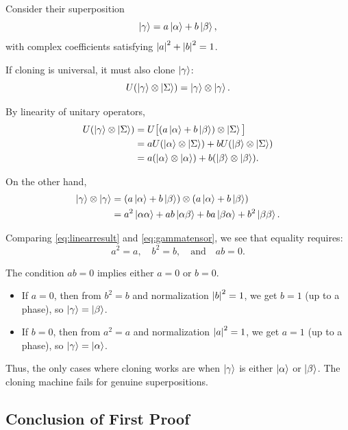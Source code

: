 \documentclass[12pt]{article}
\newcommand{\tensor}{\otimes}
\begin{document}
Consider their superposition
\[
\ket{\gamma} = a\ket{\alpha} + b\ket{\beta},
\]
with complex coefficients satisfying $\abs{a}^2 + \abs{b}^2 = 1$.

If cloning is universal, it must also clone $\ket{\gamma}$:
\begin{equation}
U(\ket{\gamma} \tensor \ket{\Sigma}) = \ket{\gamma} \tensor \ket{\gamma}.
\label{eq:clonepsi}
\end{equation}

By linearity of unitary operators,
\begin{align}
U(\ket{\gamma} \tensor \ket{\Sigma})
&= U\big[(a\ket{\alpha} + b\ket{\beta}) \tensor \ket{\Sigma}\big] \\
&= aU(\ket{\alpha} \tensor \ket{\Sigma}) + bU(\ket{\beta} \tensor \ket{\Sigma}) \\
&= a(\ket{\alpha} \tensor \ket{\alpha}) + b(\ket{\beta} \tensor \ket{\beta}).
\label{eq:linearresult}
\end{align}

On the other hand,
\begin{align}
\ket{\gamma} \tensor \ket{\gamma}
&= (a\ket{\alpha} + b\ket{\beta}) \tensor (a\ket{\alpha} + b\ket{\beta}) \\
&= a^2 \ket{\alpha\alpha}
+ ab \ket{\alpha\beta}
+ ba \ket{\beta\alpha}
+ b^2 \ket{\beta\beta}.
\label{eq:gammatensor}
\end{align}

Comparing \eqref{eq:linearresult} and \eqref{eq:gammatensor}, we see that equality requires:
\[
a^2 = a, \quad b^2 = b, \quad \text{and} \quad ab = 0.
\]

The condition $ab = 0$ implies either $a = 0$ or $b = 0$.
\begin{itemize}
    \item If $a = 0$, then from $b^2 = b$ and normalization $\abs{b}^2 = 1$, we get $b = 1$ (up to a phase), so $\ket{\gamma} = \ket{\beta}$.
    \item If $b = 0$, then from $a^2 = a$ and normalization $\abs{a}^2 = 1$, we get $a = 1$ (up to a phase), so $\ket{\gamma} = \ket{\alpha}$.
\end{itemize}

Thus, the only cases where cloning works are when $\ket{\gamma}$ is either $\ket{\alpha}$ or $\ket{\beta}$. The cloning machine fails for genuine superpositions.

\subsection{Conclusion of First Proof}
\end{document}
